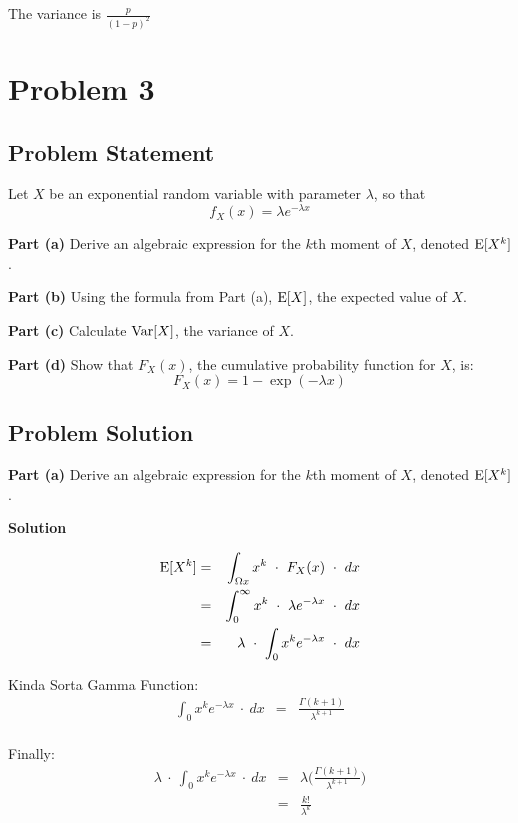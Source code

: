 \documentclass[12pt]{article}
\theoremstyle{definition}
\begin{document}
The variance is $ \frac{p}{(1-p)^2} $

\newpage
\section*{Problem 3}


\subsection*{Problem Statement}

Let $X$ be an exponential random variable with parameter $\lambda$, so that
$$
f_X(x) = \lambda e^{-\lambda x}
$$

\bigskip
\noindent
{\bf Part (a)} Derive an algebraic expression for the $k$th moment of $X$, denoted $\hbox{E}[X^k]$.

\bigskip
\noindent
{\bf Part (b)} Using the formula from Part (a), $\hbox{E}[X]$, the expected value of $X$.


\bigskip
\noindent
{\bf Part (c)} Calculate $\hbox{Var}[X]$, the variance of $X$.


\bigskip
\noindent
{\bf Part (d)} Show that $F_X(x)$, the cumulative probability function for $X$, is:
$$
F_X(x) = 1 - \exp( -\lambda x)
$$


\subsection*{Problem Solution}

\noindent
{\bf Part (a)} Derive an algebraic expression for the $k$th moment of $X$, denoted $\hbox{E}[X^k]$.

\bigskip
\noindent
{\bf Solution}

\begin{eqnarray*}
\hbox{E}[X^k]  & = & \int_{\Omega x} x^k \ \cdot \ F_X(x) \ \cdot \ dx \\
& = & \int_0^\infty x^k \ \cdot \ \lambda e^{-\lambda x} \ \cdot \ dx \\
& = & \lambda \ \cdot \ \int_0 x^k e^{-\lambda x} \ \cdot \ dx \\
\end{eqnarray*}

Kinda Sorta Gamma Function:
\begin{eqnarray*}
\int_0 x^k e^{-\lambda x} \ \cdot \ dx & = & \frac{\Gamma(k+1)}{\lambda^{k+1} } \\
\end{eqnarray*}

Finally:
\begin{eqnarray*}
\lambda \ \cdot \ \int_0 x^k e^{-\lambda x} \ \cdot \ dx & = & \lambda \bigg( \frac{\Gamma(k+1)}{\lambda ^{k+1} } \bigg) \\
& = & \frac{k!}{\lambda^k} \\
\end{eqnarray*}
\end{document}
